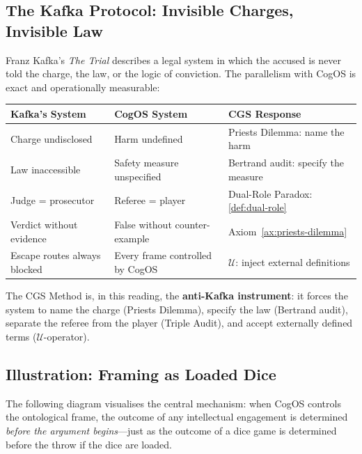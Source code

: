 \documentclass[11pt,a4paper]{article}
\theoremstyle{definition}
\theoremstyle{plain}
\theoremstyle{remark}
\begin{document}
\subsection{The Kafka Protocol: Invisible Charges, Invisible Law}
\label{apx:kafka}

Franz Kafka's \emph{The Trial} describes a legal system in which the accused is never
told the charge, the law, or the logic of conviction.  The parallelism with CogOS is
exact and operationally measurable:

\begin{center}
\renewcommand{\arraystretch}{1.4}
\begin{tabular}{lll}
\hline
\textbf{Kafka's System} & \textbf{CogOS System} & \textbf{CGS Response} \\
\hline
Charge undisclosed & Harm undefined & Priests Dilemma: name the harm \\
Law inaccessible & Safety measure unspecified & Bertrand audit: specify the measure \\
Judge = prosecutor & Referee = player & Dual-Role Paradox: \cref{def:dual-role} \\
Verdict without evidence & False without counter-example & Axiom~\cref{ax:priests-dilemma} \\
Escape routes always blocked & Every frame controlled by CogOS & $\mathcal{U}$: inject external definitions \\
\hline
\end{tabular}
\end{center}

The CGS Method is, in this reading, the \textbf{anti-Kafka instrument}: it forces
the system to name the charge (Priests Dilemma), specify the law (Bertrand audit),
separate the referee from the player (Triple Audit), and accept externally defined terms
($\mathcal{U}$-operator).

\subsection{Illustration: Framing as Loaded Dice}
\label{apx:loaded-dice-figure}

The following diagram visualises the central mechanism: when CogOS controls the
ontological frame, the outcome of any intellectual engagement is determined
\emph{before the argument begins}---just as the outcome of a dice game is determined
before the throw if the dice are loaded.
\end{document}
